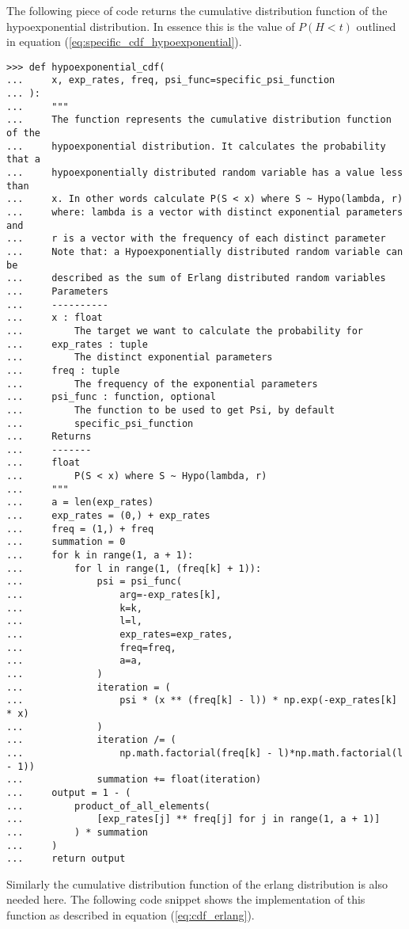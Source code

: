 The following piece of code returns the cumulative distribution function of
the hypoexponential distribution.
In essence this is the value of \(P(H<t)\) outlined in equation
(\ref{eq:specific_cdf_hypoexponential}).

\begin{lstlisting}[style=pystyle]
>>> def hypoexponential_cdf(
...     x, exp_rates, freq, psi_func=specific_psi_function
... ):
...     """
...     The function represents the cumulative distribution function of the
...     hypoexponential distribution. It calculates the probability that a
...     hypoexponentially distributed random variable has a value less than
...     x. In other words calculate P(S < x) where S ~ Hypo(lambda, r)
...     where: lambda is a vector with distinct exponential parameters and 
...     r is a vector with the frequency of each distinct parameter
...     Note that: a Hypoexponentially distributed random variable can be
...     described as the sum of Erlang distributed random variables
...     Parameters
...     ----------
...     x : float
...         The target we want to calculate the probability for
...     exp_rates : tuple
...         The distinct exponential parameters
...     freq : tuple
...         The frequency of the exponential parameters
...     psi_func : function, optional
...         The function to be used to get Psi, by default
...         specific_psi_function
...     Returns
...     -------
...     float
...         P(S < x) where S ~ Hypo(lambda, r)
...     """
...     a = len(exp_rates)
...     exp_rates = (0,) + exp_rates
...     freq = (1,) + freq
...     summation = 0
...     for k in range(1, a + 1):
...         for l in range(1, (freq[k] + 1)):
...             psi = psi_func(
...                 arg=-exp_rates[k],
...                 k=k,
...                 l=l,
...                 exp_rates=exp_rates,
...                 freq=freq,
...                 a=a,
...             )
...             iteration = (
...                 psi * (x ** (freq[k] - l)) * np.exp(-exp_rates[k] * x)
...             )
...             iteration /= (
...                 np.math.factorial(freq[k] - l)*np.math.factorial(l - 1))
...             summation += float(iteration)
...     output = 1 - (
...         product_of_all_elements(
...             [exp_rates[j] ** freq[j] for j in range(1, a + 1)]
...         ) * summation
...     )
...     return output

\end{lstlisting}

Similarly the cumulative distribution function of the erlang distribution is
also needed here.
The following code snippet shows the implementation of this function as
described in equation (\ref{eq:cdf_erlang}).

